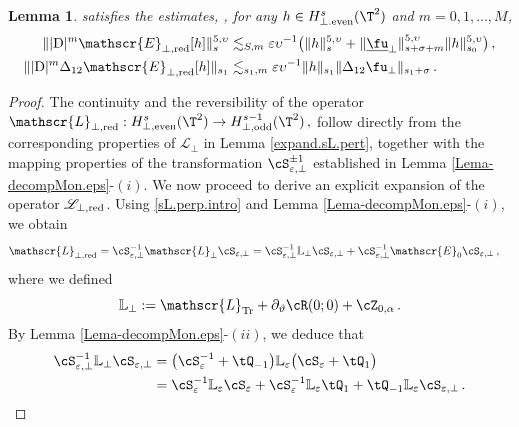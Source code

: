 \documentclass[a4paper,reqno,10pt]{article}
\newtheorem{lem}{Lemma}[section]
\newcommand{\pa}{\partial}
\newcommand{\sL}{\mathscr{L}}
\newcommand{\sE}{\mathscr{E}}
\newcommand{\LL}{\mathbb{L}}
\begin{document}
\begin{lem}
	satisfies the estimates, , for any $h\in H_{\perp.{\rm even}}^s(\T^2)$ and $m=0,1,...,M$,
	\begin{align}
		\| |{\rm D}|^{m}\sE_{\perp,{\rm red}}[h]  \|_{s}^{5,\upsilon} & \lesssim_{S,m} \varepsilon\upsilon^{-1} \big( \| h\|_{s}^{5,\upsilon}  + \| \underline{\fu}_{\perp}\|_{s+\sigma+m}^{5,\upsilon} \|  h \|_{s_0}^{5,\upsilon}  \big)  \,, \label{sE.perp.est} \\
		\| |{\rm D}|^{m}\Delta_{12}\sE_{\perp,{\rm red}}[h] \|_{s_1}& \lesssim_{s_1,m} \varepsilon \upsilon^{-1}  \| h \|_{s_1}  \| \Delta_{12}\fu_{\perp} \|_{s_1+\sigma}  \,.%
	\end{align}
\end{lem}
\begin{proof}
The continuity and the reversibility  of the operator $\displaystyle{
			\sL_{\perp,{\rm red}}  : H_{\perp,{\rm even}}^{s}(\T^2) \to H_{\perp,{\rm odd}}^{s-1}(\T^2)}
			\,,
		$
follow directly from the corresponding properties of $\sL_{\perp}$ in Lemma \ref{expand.sL.pert}, together with the mapping properties of the transformation $\cS_{\varepsilon,\perp}^{\pm 1}$ established in Lemma \ref{Lema-decompMon.eps}-$(i)$.
    We now proceed to derive an explicit expansion of the operator $\sL_{\perp,{\rm red}}$. Using  \eqref{sL.perp.intro} and Lemma \ref{Lema-decompMon.eps}-$(i)$, we obtain
    \begin{align}
        \sL_{\perp,{\rm red}} & = \cS_{\varepsilon,\perp}^{-1} \sL_{\perp} \cS_{\varepsilon,\perp}  = \cS_{\varepsilon,\perp}^{-1} \LL_{\perp} \cS_{\varepsilon,\perp} + \cS_{\varepsilon,\perp}^{-1} \sE_{0} \cS_{\varepsilon,\perp}\,, \label{conj.eps1}
    \end{align}
    where we defined
    \begin{equation}
        \LL_{\perp}:= \sL_{\rm Tr} + \pa_{\vartheta} \cR(0;0) + \cZ_{0,\alpha} \,.
    \end{equation}
    By Lemma \ref{Lema-decompMon.eps}-$(ii)$, we deduce  that
    \begin{align}
        \cS_{\varepsilon,\perp}^{-1} \LL_{\perp} \cS_{\varepsilon,\perp} & = \big(\cS_{\varepsilon}^{-1} + \tQ_{-1} \big) \LL_{\varepsilon} \big( \cS_{\varepsilon}+ \tQ_{1} \big) \\
        & = \cS_{\varepsilon}^{-1} \LL_{\varepsilon} \cS_{\varepsilon} + \cS_{\varepsilon}^{-1} \LL_{\varepsilon} \tQ_{1} + \tQ_{-1} \LL_{\varepsilon} \cS_{\varepsilon,\perp} \,. \label{conj.eps2}

\end{align}
\end{proof}
\end{document}
